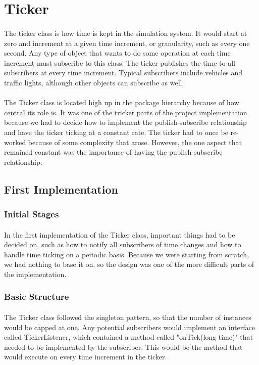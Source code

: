 \documentclass[a4paper,11pt,titlepage]{article}
\begin{document}
\section{Ticker}
\paragraph{}
The ticker class is how time is kept in the simulation system. It would start at zero and increment at a given time increment, or granularity, such as every one second. Any type of object that wants to do some operation at each time increment must subscribe to this class. The ticker publishes the time to all subscribers at every time increment. Typical subscribers include vehicles and traffic lights, although other objects can subscribe as well.
\paragraph{}
The Ticker class is located high up in the package hierarchy because of how central its role is. It was one of the tricker parts of the project implementation because we had to decide how to implement the publish-subscribe relationship and have the ticker ticking at a constant rate. The ticker had to once be re-worked because of some complexity that arose. However, the one aspect that remained constant was the importance of having the publish-subscribe relationship.
\subsection{First Implementation}
\subsubsection{Initial Stages}
\paragraph{}
In the first implementation of the Ticker class, important things had to be decided on, such as how to notify all subscribers of time changes and how to handle time ticking on a periodic basis. Because we were starting from scratch, we had nothing to base it on, so the design was one of the more difficult parts of the implementation.
\subsubsection{Basic Structure}
\paragraph{}
The Ticker class followed the singleton pattern, so that the number of instances would be capped at one. Any potential subscribers would implement an interface called TickerListener, which contained a method called "onTick(long time)" that needed to be implemented by the subscriber. This would be the method that would execute on every time increment in the ticker.
\end{document}
